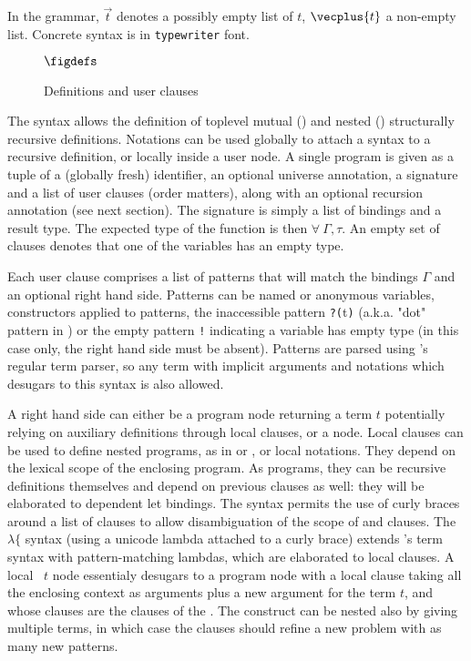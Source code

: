 In the grammar, $\vec{t}$ denotes a possibly empty list of $t$,
$\vecplus{t}$ a non-empty list. Concrete syntax is in
\texttt{typewriter} font.
\begin{figure}[h]
\centering$\figdefs$
\caption{Definitions and user clauses}
\label{fig:usergram}
\end{figure}
The syntax allows the definition of toplevel mutual () and
nested () structurally recursive definitions. 
Notations can be used globally to attach a syntax to a 
recursive definition, or locally inside a user node. A single program is given as a tuple of a (globally
fresh) identifier, an optional universe annotation, 
a signature and a list of user clauses (order matters), along with an optional recursion annotation (see next
section). The signature is simply a list of bindings and a result
type. The expected type of the function  is then $∀~Γ, τ$.
An empty set of clauses denotes that one of the variables has an empty type.

Each user clause comprises a list of patterns that will match the
bindings $Γ$ and an optional right hand side. Patterns can be named or
anonymous variables, constructors applied to patterns, the inaccessible
pattern \texttt{?(}t\texttt{)} (a.k.a. "dot" pattern in \Agda) or the
empty pattern \texttt{!} indicating a variable has empty type (in this
case only, the right hand side must be absent). Patterns are parsed
using \Coq's regular term parser, so any term with implicit arguments
and notations which desugars to this syntax is also allowed.

A right hand side can either be a program node returning a term $t$
potentially relying on auxiliary definitions through local 
clauses, or a  node.  Local  clauses can be used to
define nested programs, as in \Haskell or \Agda, or local
notations. They depend on the lexical scope of the enclosing program. As
programs, they can be recursive definitions themselves and depend on
previous  clauses as well: they will be elaborated to
dependent let bindings. The syntax permits the use of curly braces
around a list of clauses to allow disambiguation of the scope of
 and  clauses. The $\lambda\{$ syntax (using a
unicode lambda attached to a curly brace) extends \Coq's term syntax
with pattern-matching lambdas, which are elaborated to local 
clauses. A local ~$t$ node essentialy desugars to a program
node with a local  clause taking all the enclosing context as
arguments plus a new argument for the term $t$, and whose clauses are
the clauses of the . The  construct can be nested also
by giving multiple terms, in which case the clauses should refine a new
problem with as many new patterns.


